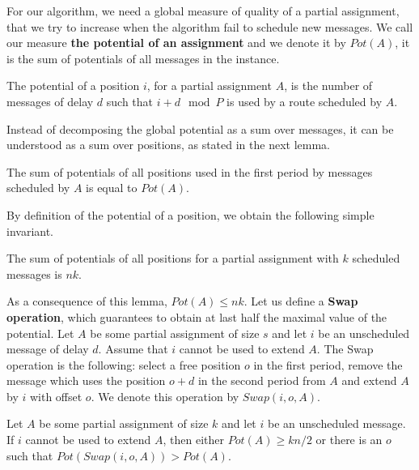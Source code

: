 \documentclass[a4paper,cleveref, autoref, thm-restate,UKenglish]{lipics-v2019}
\begin{document}
For our algorithm, we need a global measure of quality of a partial assignment, 
that we try to increase when the algorithm fail to schedule new messages. 
We call our measure \textbf{the potential of an assignment} and we denote it by $Pot(A)$, it is the sum of potentials of all messages in the instance.


\begin{definition}
The potential of a position $i$, for a partial assignment $A$, is the number of messages of delay $d$ such that $i+d \mod P$ is used by a route scheduled by $A$. 
\end{definition}

Instead of decomposing the global potential as a sum over messages, it can be understood
as a sum over positions, as stated in the next lemma.

\begin{lemma}\label{lemma:pot_pos}
The sum of potentials of all positions used in the first period by messages scheduled by $A$ is equal to $Pot(A)$.  
\end{lemma}

By definition of the potential of a position, we obtain the following simple invariant.

\begin{lemma}\label{lemma:inv}
The sum of potentials of all positions for a partial assignment with $k$ scheduled messages is $nk$.  
\end{lemma}

 As a consequence of this lemma, $Pot(A) \leq nk$. Let us define a \textbf{Swap operation},
 which guarantees to obtain at last half the maximal value of the potential.
Let $A$ be some partial assignment of size $s$ and let $i$ be an unscheduled message of delay $d$. 
Assume that $i$ cannot be used to extend $A$. The Swap operation is the following: 
select a free position $o$ in the first period, remove the message which uses the position $o+d$ in the second period from $A$ and extend $A$ by $i$ with offset $o$. We denote this operation by $Swap(i,o,A)$.

\begin{lemma}\label{lemma:swap}
Let $A$ be some partial assignment of size $k$ and let $i$ be an unscheduled message. If $i$ cannot be used to extend $A$, then either $Pot(A) \geq kn/2$ or there is an $o$ such that $Pot(Swap(i,o,A)) > Pot(A)$.
\end{lemma}
\end{document}

